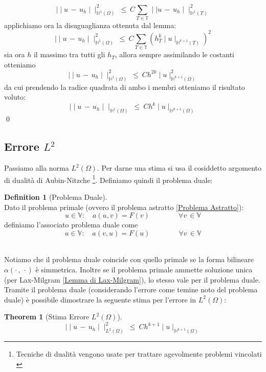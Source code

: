 \documentclass[12pt,a4paper]{report}
\theoremstyle{theorem}
\newtheorem{theorem}{Theorem}[section]
\theoremstyle{theorem}
\theoremstyle{definition}
\newtheorem{definition}{Definition}[section]
\begin{document}
\[ \mid \mid u \, - \, u_{h} \mid \mid_{\mathbb{H}^{1}(\Omega)}^{2} \ \leq \ C \sum_{T \in \mathbb{T}} \mid \mid u \, - \, u_{h} \mid \mid_{\mathbb{H}^{1}(T)}^2 \]
applichiamo ora la disuguaglianza ottenuta dal lemma:
\[ \mid \mid u \, - \, u_{h} \mid \mid_{\mathbb{H}^{1}(\Omega)}^{2} \ \leq \ C \sum_{T \in \mathbb{T}} (h_{T}^{k} \mid u \mid_{\mathbb{H}^{k+1}(T)})^2 \]
sia ora $h$ il massimo tra tutti gli $h_{T}$, allora sempre assimilando le costanti otteniamo
\[ \mid \mid u \, - \, u_{h} \mid \mid_{\mathbb{H}^{1}(\Omega)}^{2} \ \leq \ C h^{2k} \mid u \mid_{\mathbb{H}^{k+1}(\Omega)}^2 \]
da cui prendendo la radice quadrata di ambo i membri otteniamo il risultato voluto:
\[ \mid \mid u \, - \, u_{h} \mid \mid_{\mathbb{H}^{1}(\Omega)} \ \leq \ C h^{k} \mid u \mid_{\mathbb{H}^{k+1}(\Omega)} \]
\qed
\hfill


\subsection{Errore $L^{2}$}
Passiamo alla norma $L^{2}(\Omega)$. Per darne una stima si usa il cosiddetto argomento di dualità di Aubin-Nitzche \footnote{Tecniche di dualità vengono usate per trattare agevolmente problemi vincolati \cite{BBFmixed}}. Definiamo quindi il problema duale:
\begin{definition} [Problema Duale] \label{Problema Duale} 
\hfill \\
Dato il problema primale (ovvero il problema astratto \ref{Problema Astratto}):
\[ u \in  \mathbb{V} : \quad a(u,v) = F(v) \qquad \qquad \forall v \, \in \mathbb{V} \]
definiamo l'associato problema duale come
\[ u \in  \mathbb{V} : \quad a(v,u) = F(u) \qquad \qquad \forall v \, \in \mathbb{V} \]
\end{definition} 
\hfill \\
Notiamo che il problema duale coincide con quello primale se la forma bilineare $\alpha (\cdot \, , \, \cdot)$ è simmetrica. Inoltre se il problema primale ammette soluzione unica (per Lax-Milgram \ref{Lemma di Lax-Milgram}), lo stesso vale per il problema duale. Tramite il problema duale (considerando l'errore come temine noto del problema duale) è possibile dimostrare la seguente stima per l'errore in $L^{2}(\Omega)$:
\begin{theorem} [Stima Errore $L^2(\Omega)$] \label{Stima Errore L2} 
\[ \mid \mid u \, - \, u_{h} \mid \mid_{L^{2}(\Omega)}^{2} \ \leq \ C h^{k+1} \mid u \mid_{\mathbb{H}^{k+1}(\Omega)} \]
\end{theorem}
\end{document}
